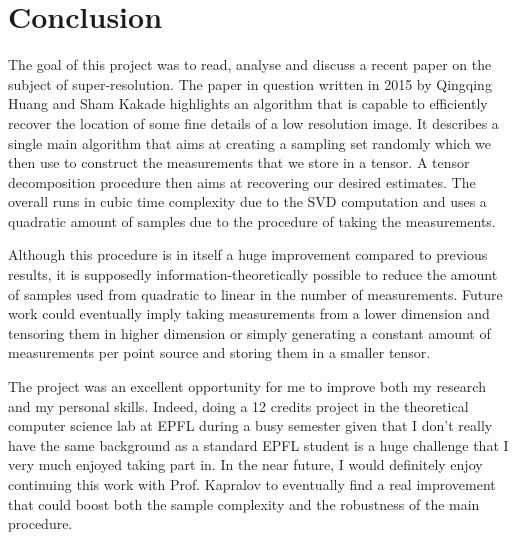 \chapter{Conclusion}
The goal of this project was to read, analyse and discuss a recent paper on the subject of super-resolution. The paper in question written in 2015 by Qingqing Huang and Sham Kakade highlights an algorithm that is capable to efficiently recover the location of some fine details of a low resolution image. It describes a single main algorithm that aims at creating a sampling set randomly which we then use to construct the measurements that we store in a tensor. A tensor decomposition procedure then aims at recovering our desired estimates. The overall runs in cubic time complexity due to the SVD computation and uses a quadratic amount of samples due to the procedure of taking the measurements.\par

Although this procedure is in itself a huge improvement compared to previous results, it is supposedly information-theoretically possible to reduce the amount of samples used from quadratic to linear in the number of measurements. Future work could eventually imply taking measurements from a lower dimension and tensoring them in higher dimension or simply generating a constant amount of measurements per point source and storing them in a smaller tensor.\par

The project was an excellent opportunity for me to improve both my research and my personal skills. Indeed, doing a 12 credits project in the theoretical computer science lab at EPFL during a busy semester given that I don't really have the same background as a standard EPFL student is a huge challenge that I very much enjoyed taking part in. In the near future, I would definitely enjoy continuing this work with Prof. Kapralov to eventually find a real improvement that could boost both the sample complexity and the robustness of the main procedure.